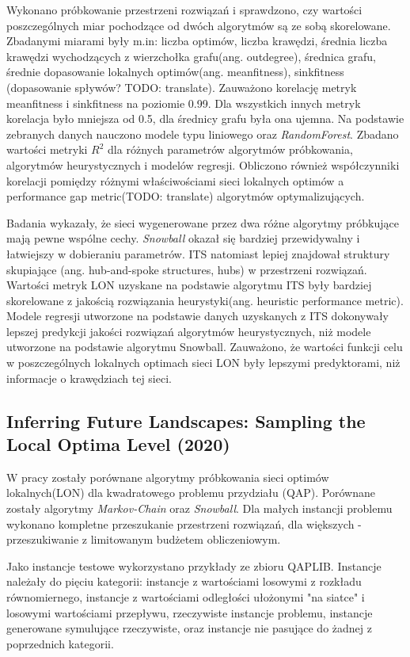 Wykonano próbkowanie przestrzeni rozwiązań i sprawdzono, czy wartości poszczególnych miar pochodzące od dwóch algorytmów
są ze sobą skorelowane.
Zbadanymi miarami były m.in: liczba optimów, liczba krawędzi, średnia liczba krawędzi wychodzących z wierzchołka grafu(ang. outdegree),
średnica grafu, średnie dopasowanie lokalnych optimów(ang. meanfitness), sinkfitness (dopasowanie spływów? TODO: translate).
Zauważono korelację metryk meanfitness i sinkfitness  na poziomie 0.99.
Dla wszystkich innych metryk korelacja było mniejsza od 0.5, dla średnicy grafu była ona ujemna.
Na podstawie zebranych danych nauczono modele typu liniowego oraz \textit{RandomForest}.
Zbadano wartości metryki $R^{2}$ dla różnych parametrów algorytmów próbkowania, algorytmów heurystycznych
i modelów regresji.
Obliczono również współczynniki korelacji pomiędzy różnymi właściwościami sieci lokalnych optimów
a performance gap metric(TODO: translate) algorytmów optymalizujących.

Badania wykazały, że sieci wygenerowane przez dwa różne algorytmy próbkujące mają pewne wspólne cechy.
\textit{Snowball} okazał się bardziej przewidywalny i łatwiejszy w dobieraniu parametrów.
ITS natomiast lepiej znajdował struktury skupiające (ang. hub-and-spoke structures, hubs) w przestrzeni rozwiązań.
Wartości metryk LON uzyskane na podstawie algorytmu ITS były bardziej skorelowane z
jakością rozwiązania heurystyki(ang. heuristic performance metric).
Modele regresji utworzone na podstawie danych uzyskanych z ITS dokonywały lepszej predykcji
jakości rozwiązań algorytmów heurystycznych, niż modele utworzone na podstawie algorytmu Snowball.
Zauważono, że wartości funkcji celu w poszczególnych lokalnych optimach sieci LON
były lepszymi predyktorami, niż informacje o krawędziach tej sieci.

\subsection*{Inferring Future Landscapes: Sampling the Local Optima Level (2020) \cite{DBLP:journals/ec/ThomsonOVV20}}
W pracy zostały porównane algorytmy próbkowania sieci optimów lokalnych(LON) dla kwadratowego problemu przydziału (QAP).
Porównane zostały algorytmy \textit{Markov-Chain} oraz \textit{Snowball}.
Dla małych instancji problemu wykonano kompletne przeszukanie przestrzeni rozwiązań,
dla większych - przeszukiwanie z limitowanym budżetem obliczeniowym.

Jako instancje testowe wykorzystano przykłady ze zbioru QAPLIB.
Instancje należały do pięciu kategorii: instancje z wartościami losowymi z rozkładu równomiernego,
instancje z wartościami odległości ułożonymi "na siatce" i losowymi wartościami przepływu, rzeczywiste instancje problemu,
instancje generowane symulujące rzeczywiste, oraz instancje nie pasujące do żadnej z poprzednich kategorii.

